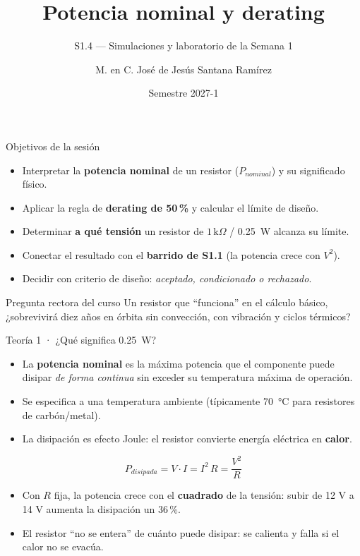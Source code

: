 \documentclass[aspectratio=169]{beamer}
\title[S1.4 · Derating]{Potencia nominal y derating}
\subtitle{S1.4 — Simulaciones y laboratorio de la Semana 1}
\institute{Licenciatura en Ingeniería Aeroespacial\\ UNAM · ENES Unidad Juriquilla}
\author{M. en C. José de Jesús Santana Ramírez}
\date{Semestre 2027-1}
\begin{document}
\begin{frame}[plain]
  \titlepage
\end{frame}

\begin{frame}{Objetivos de la sesión}
  \begin{itemize}
    \item Interpretar la \textbf{potencia nominal} de un resistor ($P_{nominal}$) y su significado físico.
    \item Aplicar la regla de \textbf{derating de 50\,\%} y calcular el límite de diseño.
    \item Determinar \textbf{a qué tensión} un resistor de $1\,\text{k}\Omega$ / \SI{0.25}{\watt} alcanza su límite.
    \item Conectar el resultado con el \textbf{barrido de S1.1} (la potencia crece con $V^2$).
    \item Decidir con criterio de diseño: \emph{aceptado, condicionado o rechazado}.
  \end{itemize}
  \pause
  \begin{block}{Pregunta rectora del curso}
    Un resistor que ``funciona'' en el cálculo básico, ¿sobrevivirá diez años en órbita sin convección, con vibración y ciclos térmicos?
  \end{block}
\end{frame}

\begin{frame}{Teoría 1 · ¿Qué significa \SI{0.25}{\watt}?}
  \begin{itemize}
    \item La \textbf{potencia nominal} es la máxima potencia que el componente puede disipar
      \emph{de forma continua} sin exceder su temperatura máxima de operación.
    \item Se especifica a una temperatura ambiente (típicamente \SI{70}{\celsius} para resistores de carbón/metal).
    \item La disipación es efecto Joule: el resistor convierte energía eléctrica en \textbf{calor}.
  \end{itemize}
  \[
    P_{disipada} = V\cdot I = I^2\,R = \frac{V^2}{R}
  \]
  \pause
  \begin{itemize}
    \item Con $R$ fija, la potencia crece con el \textbf{cuadrado} de la tensión:
      subir de 12 V a 14 V aumenta la disipación un 36\,\%.
    \item El resistor ``no se entera'' de cuánto puede disipar: se calienta y falla si el calor no se evacúa.
  \end{itemize}
\end{frame}
\end{document}
